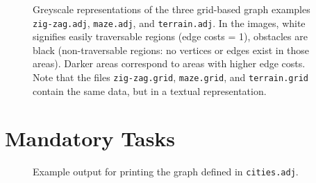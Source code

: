 \documentclass[a4paper,10pt]{article}
\begin{document}
\begin{figure}
  \centering
  \hfill
  \hfill
  \caption{
    Greyscale representations of the three grid-based graph examples \texttt{zig-zag.adj}, \texttt{maze.adj}, and \texttt{terrain.adj}.
    In the images, white signifies easily traversable regions (edge costs = 1), obstacles are black (non-traversable regions: no vertices or edges exist in those areas).
    Darker areas correspond to areas with higher edge costs.
    Note that the files \texttt{zig-zag.grid}, \texttt{maze.grid}, and \texttt{terrain.grid} contain the same data, but in a textual representation.
  }\label{fig:grid-examples}
\end{figure}



\section{Mandatory Tasks}

\begin{figure}
  \centering
  \caption{
    Example output for printing the graph defined in \texttt{cities.adj}.
  }\label{fig:graph-dump-example}
\end{figure}
\end{document}
